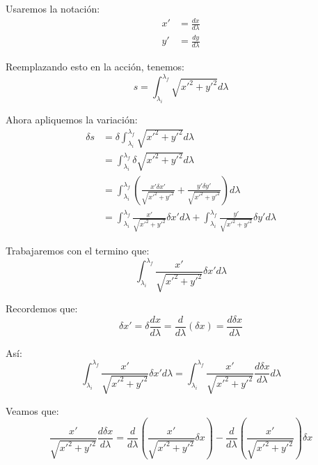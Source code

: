 \documentclass[paper=a4, fontsize=11pt,twoside]{scrartcl}
\begin{document}
Usaremos la notaci\'on:
	\begin{align*}
		x' &= \frac{dx}{d\lambda} \\
		y' &= \frac{dy}{d\lambda}
	\end{align*}

Reemplazando esto en la acci\'on, tenemos:
	\begin{equation*}
		s = \int^{\lambda_{f}}_{\lambda_{i}} \sqrt{x'^{2} + y'^{2}}d\lambda
	\end{equation*}	
		
Ahora apliquemos la variaci\'on:
	\begin{align*}
		\delta s &= \delta \int^{\lambda_{f}}_{\lambda_{i}}  \sqrt{ x'^{2} + y'^{2} }d\lambda \\
				 &= \int^{\lambda_{f}}_{\lambda_{i}}  \delta \sqrt{ x'^{2} + y'^{2} }d\lambda \\
				 &= \int^{\lambda_{f}}_{\lambda_{i}}  \left( \frac{x' \delta x'}{\sqrt{ x'^{2} + y'^{2} }} + \frac{y' \delta y'}{\sqrt{ x'^{2} + y'^{2} }} \right) d\lambda \\
				 &= \int^{\lambda_{f}}_{\lambda_{i}}  \frac{x'}{\sqrt{ x'^{2} + y'^{2} }} \delta x' d\lambda 
				  + \int^{\lambda_{f}}_{\lambda_{i}}  \frac{y'}{\sqrt{ x'^{2} + y'^{2} }} \delta y' d\lambda
	\end{align*}

Trabajaremos con el termino que:
	\begin{equation*}
		\int^{\lambda_{f}}_{\lambda_{i}}  \frac{x'}{\sqrt{ x'^{2} + y'^{2} }} \delta x' d\lambda  
	\end{equation*}

Recordemos que:
	\begin{equation*}
		\delta x'= \delta \frac{dx}{d\lambda} = \frac{d}{d\lambda} \left( \delta x \right) = \frac{d \delta x}{d\lambda}
	\end{equation*}

As\'i:
	\begin{equation*}
		\int^{\lambda_{f}}_{\lambda_{i}}  \frac{x'}{\sqrt{ x'^{2} + y'^{2} }} \delta x' d\lambda =  \int^{\lambda_{f}}_{\lambda_{i}}  \frac{x'}{\sqrt{ x'^{2} + y'^{2} }} \frac{d \delta x}{d\lambda} d\lambda 
	\end{equation*}

Veamos que:
	\begin{equation*}
		\frac{x'}{\sqrt{ x'^{2} + y'^{2} }} \frac{d \delta x}{d\lambda} = \frac{d}{d\lambda} \left( \frac{x'}{\sqrt{ x'^{2} + y'^{2} }} \delta x  \right) 
																		  - \frac{d}{d\lambda} \left( \frac{x'}{\sqrt{ x'^{2} + y'^{2} }}  \right) \delta x 
	\end{equation*}
\end{document}
